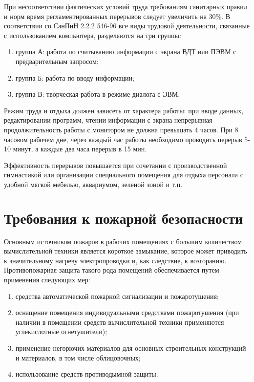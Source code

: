 При несоответствии фактических условий труда требованиям санитарных правил и норм время регламентированных перерывов следует увеличить на 30\%. В соответствии со СанПиН 2.2.2 546-96 все виды трудовой деятельности, связанные с использованием компьютера, разделяются на три группы: 
\begin{enumerate}
	\item группа А: работа по считыванию информации с экрана ВДТ или ПЭВМ с предварительным запросом; 
	\item группа Б: работа по вводу информации; 
	\item группа В: творческая работа в режиме диалога с ЭВМ. 
\end{enumerate}

Режим труда и отдыха должен зависеть от характера работы: при вводе данных, редактировании программ, чтении информации с экрана непрерывная продолжительность работы с монитором не должна превышать 4 часов. При 8 часовом рабочем дне, через каждый час работы необходимо проводить перерыв 5-10 минут, а каждые два часа перерыв в 15 мин.

Эффективность перерывов повышается при сочетании с производственной гимнастикой или организации специального помещения для отдыха персонала с удобной мягкой мебелью, аквариумом, зеленой зоной и т.п.

\section{Требования к пожарной безопасности}
Основным источником пожаров в рабочих помещениях с большим количеством вычислительной техники является короткое замыкание, которое может приводить к значительному нагреву электропроводки и, как следствие, к возгоранию. Противопожарная защита такого рода помещений обеспечивается путем применения следующих мер:
\renewcommand{\labelenumi}{\asbuk{enumi})}

\begin{enumerate}
	\item средства автоматической пожарной сигнализации и пожаротушения;
	\item оснащение помещения индивидуальными средствами пожаротушения (при наличии в помещении средств вычислительной техники применяются углекислотные огнетушители);
	\item применение негорючих материалов для основных строительных конструкций и материалов, в том числе облицовочных;
	\item использование средств противодымной защиты.
\end{enumerate}


